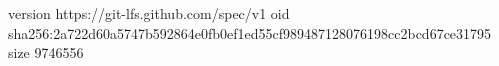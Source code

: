 version https://git-lfs.github.com/spec/v1
oid sha256:2a722d60a5747b592864e0fb0ef1ed55cf989487128076198cc2bcd67ce31795
size 9746556

